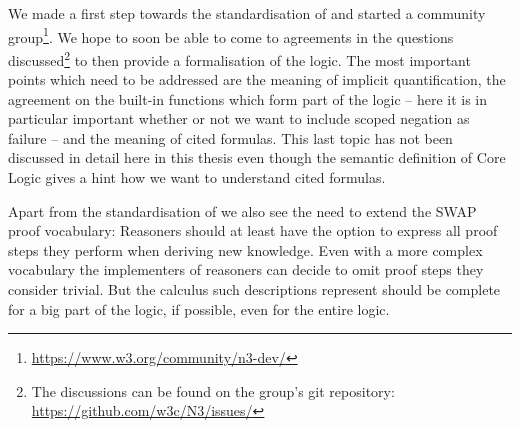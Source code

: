 We made a first step towards the standardisation of \nthree and started a 
\wwwc community group\footnote{\url{https://www.w3.org/community/n3-dev/}}.
We hope to soon be able to come to agreements in the questions discussed\footnote{The discussions can be found on the group's git repository: \url{https://github.com/w3c/N3/issues/}} 
 to then provide a formalisation of the logic.
% 
The most important points which need to be addressed are the meaning of implicit quantification, the agreement on the 
built-in functions which form part of the logic -- here it is in particular important whether or not we want to include scoped negation as failure -- and 
the meaning of cited formulas. This last topic has not been discussed in detail here in this thesis even though the semantic definition of \nthree Core Logic gives a hint
how we want to understand cited formulas. 


Apart from the standardisation of \nthreelogic we also see the need to extend the SWAP proof vocabulary: 
Reasoners should at least have the option to express all proof steps they perform when deriving new knowledge.
Even with a more complex vocabulary the implementers of reasoners can decide to omit proof steps they consider trivial.
But the calculus such descriptions represent should be complete for a big part of the logic, if possible, even for the entire logic.

